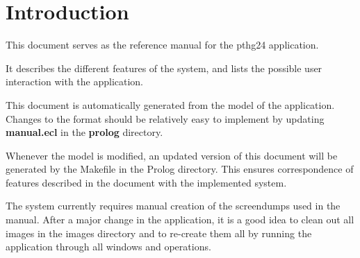 \chapter{Introduction}
This document serves as the reference manual for the pthg24 application.

It describes the different features of the system, and lists the possible user interaction with the application. 

This document is automatically generated from the model of the application. Changes to the format should be relatively easy to implement by updating \textbf{manual.ecl} in the \textbf{prolog} directory.

Whenever the model is modified, an updated version of this document will be generated by the Makefile in the Prolog directory. This ensures correspondence of features described in the document with the implemented system.

The system currently requires manual creation of the screendumps used in the manual. After a major change in the application, it is a good idea to clean out all images in the images directory and to re-create them all by running the application through all windows and operations.

